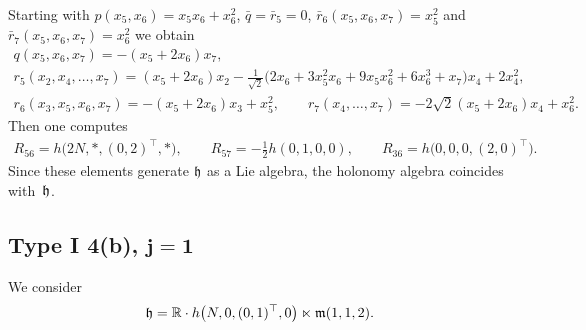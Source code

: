 \documentclass[11pt]{article}
\numberwithin{equation}{section}
\newcommand\fh{{\frak h}}
\newcommand\fm{{\frak m}}
\newcommand\RR{{\mathbb R}}
\begin{document}
\begin{Example} Starting with $p(x_5,x_6)=x_5 x_6+x_6^2$, $\bar q=\bar r_5=0$, $\bar r_6(x_5,x_6,x_7)=x_5^2$ and $\bar r_7(x_5,x_6,x_7)=x_6^2$ we obtain
\begin{gather*}
q(x_5,x_6,x_7) = -(x_5+2x_6) x_7 ,\\
r_5(x_2,x_4,\dots, x_7) = (x_5+2x_6)x_2- \tfrac1{\sqrt2} \big(2x_6+3x_5^2x_6+9x_5x_6^2+6x_6^3+x_7\big) x_4 +2 x_4^2,\\
r_6(x_3,x_5,x_6,x_7)= -(x_5+2x_6) x_3+x_5^2,\qquad
r_7(x_4,\dots, x_7)= -2\sqrt 2(x_5+2x_6)x_4+ x_6^2 .
\end{gather*}
Then one computes
\begin{gather*}R_{56}=h\big(2N,*,(0,2)^\top,*\big),\qquad R_{57}=- \tfrac12 h(0,1,0,0),\qquad R_{36}= h\big(0,0,0,(2,0)^\top\big).\end{gather*}
Since these elements generate $\fh$ as a Lie algebra, the holonomy algebra coincides with~$\fh$.
\end{Example}

\subsection[Type I 4(b), $j=1$]{Type I 4(b), $\boldsymbol{j=1}$} \label{S3.9}
We consider
\begin{gather*}\fh=\RR\cdot h\big(N,0,(0,1)^\top,0\big) \ltimes\fm(1,1,2).\end{gather*}
\end{document}
